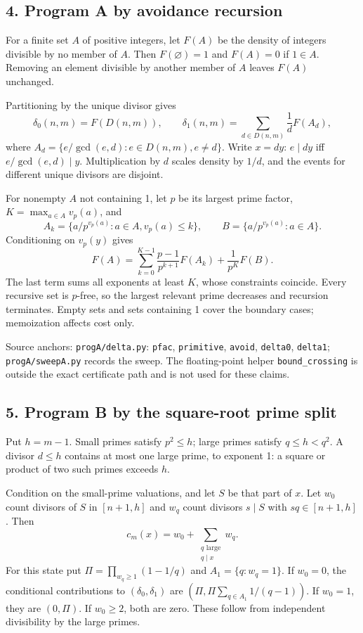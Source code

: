 \documentclass[
  11pt,
]{article}
\begin{document}
\subsection{4. Program A by avoidance
recursion}\label{program-a-by-avoidance-recursion}

For a finite set \(A\) of positive integers, let \(F(A)\) be the density
of integers divisible by no member of \(A\). Then \(F(\varnothing)=1\)
and \(F(A)=0\) if \(1\in A\). Removing an element divisible by another
member of \(A\) leaves \(F(A)\) unchanged.

Partitioning by the unique divisor gives
\[\delta_0(n,m)=F(D(n,m)),\qquad\delta_1(n,m)=\sum_{d\in D(n,m)}\frac1d F(A_d),\]
where \(A_d=\{e/\gcd(e,d):e\in D(n,m),e\ne d\}\). Write \(x=dy\):
\(e\mid dy\) iff \(e/\gcd(e,d)\mid y\). Multiplication by \(d\) scales
density by \(1/d\), and the events for different unique divisors are
disjoint.

For nonempty \(A\) not containing 1, let \(p\) be its largest prime
factor, \(K=\max_{a\in A}v_p(a)\), and
\[A_k=\{a/p^{v_p(a)}:a\in A,v_p(a)\le k\},\qquad B=\{a/p^{v_p(a)}:a\in A\}.\]
Conditioning on \(v_p(y)\) gives
\[F(A)=\sum_{k=0}^{K-1}\frac{p-1}{p^{k+1}}F(A_k)+\frac1{p^K}F(B).\] The
last term sums all exponents at least \(K\), whose constraints coincide.
Every recursive set is \(p\)-free, so the largest relevant prime
decreases and recursion terminates. Empty sets and sets containing 1
cover the boundary cases; memoization affects cost only.

Source anchors: \texttt{progA/delta.py}: \texttt{pfac},
\texttt{primitive}, \texttt{avoid}, \texttt{delta0}, \texttt{delta1};
\texttt{progA/sweepA.py} records the sweep. The floating-point helper
\texttt{bound\_crossing} is outside the exact certificate path and is
not used for these claims.

\subsection{5. Program B by the square-root prime
split}\label{program-b-by-the-square-root-prime-split}

Put \(h=m-1\). Small primes satisfy \(p^2\le h\); large primes satisfy
\(q\le h<q^2\). A divisor \(d\le h\) contains at most one large prime,
to exponent 1: a square or product of two such primes exceeds \(h\).

Condition on the small-prime valuations, and let \(S\) be that part of
\(x\). Let \(w_0\) count divisors of \(S\) in \([n+1,h]\) and \(w_q\)
count divisors \(s\mid S\) with \(sq\in[n+1,h]\). Then
\[c_m(x)=w_0+\sum_{\substack{q\text{ large}\\q\mid x}}w_q.\] For this
state put \(\Pi=\prod_{w_q\ge1}(1-1/q)\) and \(A_1=\{q:w_q=1\}\). If
\(w_0=0\), the conditional contributions to \((\delta_0,\delta_1)\) are
\((\Pi,\Pi\sum_{q\in A_1}1/(q-1))\). If \(w_0=1\), they are \((0,\Pi)\).
If \(w_0\ge2\), both are zero. These follow from independent
divisibility by the large primes.
\end{document}
